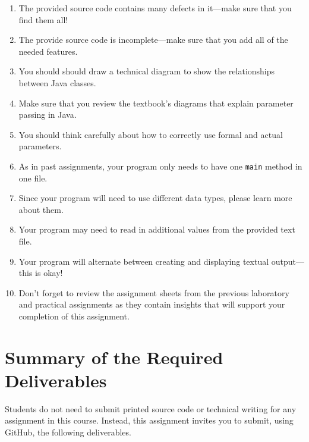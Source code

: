 \documentclass[11pt]{article}
\begin{document}
\begin{enumerate}

\item The provided source code contains many defects in it---make sure that you find them all!

\item The provide source code is incomplete---make sure that you add all of the needed features.

\item You should should draw a technical diagram to show the relationships between Java classes.

\item Make sure that you review the textbook's diagrams that explain parameter
  passing in Java.

\item You should think carefully about how to correctly use formal and actual parameters.

\item As in past assignments, your program only needs to have one {\tt main} method in one file.

\item Since your program will need to use different data types, please learn more about them.

\item Your program may need to read in additional values from the provided text file.

\item Your program will alternate between creating and displaying textual
  output---this is okay!

\item Don't forget to review the assignment sheets from the previous laboratory
  and practical assignments as they contain insights that will support your
  completion of this assignment.

\end{enumerate}

\section*{Summary of the Required Deliverables}

\noindent Students do not need to submit printed source code or technical
writing for any assignment in this course. Instead, this assignment invites you
to submit, using GitHub, the following deliverables.
\end{document}
